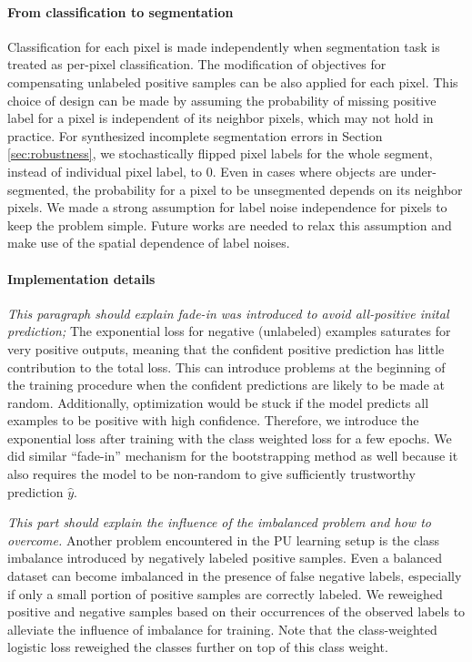 \paragraph{From classification to segmentation}
Classification for each pixel is made independently when segmentation task is treated as per-pixel classification.
The modification of objectives for compensating unlabeled positive samples can be also applied for each pixel.
This choice of design can be made by assuming the probability of missing positive label for a pixel is independent of its neighbor pixels, which may not hold in practice.
For synthesized incomplete segmentation errors in Section \ref{sec:robustness}, we stochastically flipped pixel labels for the whole segment, instead of individual pixel label, to 0.
Even in cases where objects are under-segmented, the probability for a pixel to be unsegmented depends on its neighbor pixels.
We made a strong assumption for label noise independence for pixels to keep the problem simple.
Future works are needed to relax this assumption and make use of the spatial dependence of label noises.


\paragraph{Implementation details}
\noindent \textit{This paragraph should explain fade-in was introduced to avoid all-positive inital prediction;}
\noindent
The exponential loss for negative (unlabeled) examples saturates for very positive outputs, meaning that the confident positive prediction has little contribution to the total loss.
This can introduce problems at the beginning of the training procedure when the confident predictions are likely to be made at random.
Additionally, optimization would be stuck if the model predicts all examples to be positive with high confidence.
Therefore, we introduce the exponential loss after training with the class weighted loss for a few epochs.
We did similar ``fade-in'' mechanism for the bootstrapping method as well because it also requires the model to be non-random to give sufficiently trustworthy prediction $\hat{y}$.


\noindent
\textit{This part should explain the influence of the imbalanced problem and how to overcome.}
\noindent
Another problem encountered in the PU learning setup is the class imbalance introduced by negatively labeled positive samples.
Even a balanced dataset can become imbalanced in the presence of false negative labels, especially if only a small portion of positive samples are correctly labeled.
We reweighed positive and negative samples based on their occurrences of the observed labels to alleviate the influence of imbalance for training.
Note that the class-weighted logistic loss reweighed the classes further on top of this class weight.
